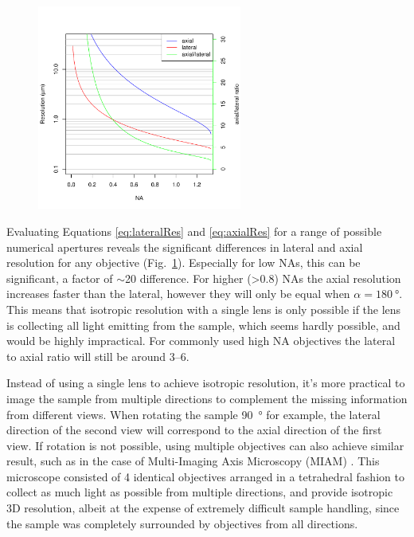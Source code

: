   \begin{figure}
    \centering
    \includegraphics[width=0.6\textwidth]{resolution}
    \label{fig:resolution}
  \end{figure}

  Evaluating Equations \ref{eq:lateralRes} and \ref{eq:axialRes} for a range of possible numerical apertures reveals the significant differences in lateral and axial resolution for any objective (Fig.~\ref{fig:resolution}). Especially for low NAs, this can be significant, a factor of $\sim$20 difference. For higher (>0.8) NAs the axial resolution increases faster than the lateral, however they will only be equal when $\alpha=\SI{180}{\degree}$. This means that isotropic resolution with a single lens is only possible if the lens is collecting all light emitting from the sample, which seems hardly possible, and would be highly impractical. For commonly used high NA objectives the lateral to axial ratio will still be around 3--6. 

  Instead of using a single lens to achieve isotropic resolution, it's more practical to image the sample from multiple directions to complement the missing information from different views. When rotating the sample \SI{90}{\degree} for example, the lateral direction of the second view will correspond to the axial direction of the first view. If rotation is not possible, using multiple objectives can also achieve similar result, such as in the case of Multi-Imaging Axis Microscopy (MIAM) \cite{swoger_multiple_2003,swoger_multi-view_2007}. This microscope consisted of 4 identical objectives arranged in a tetrahedral fashion to collect as much light as possible from multiple directions, and provide isotropic 3D resolution, albeit at the expense of extremely difficult sample handling, since the sample was completely surrounded by objectives from all directions. 

